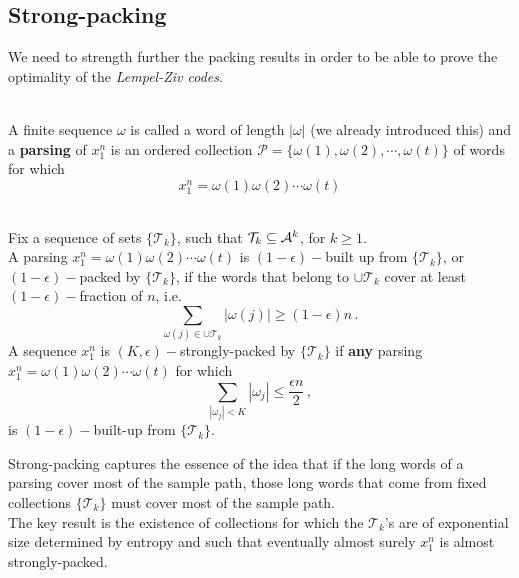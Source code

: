 \subsection{Strong-packing}
We need to strength further the packing results in order to be able to prove the optimality of the \textit{Lempel-Ziv codes}.
\begin{definition}
\hfill \\
    A finite sequence $\omega$ is called a word of length $|\omega|$ (we already introduced this) and a \textbf{parsing} of $x_1^n$ is an ordered collection $\mathcal{P} = \{ \omega(1), \omega(2), \cdots, \omega(t) \}$ of words for which 
    \begin{equation*}
        x_1^n = \omega(1) \omega(2) \cdots \omega(t)
    \end{equation*}
\end{definition}
\begin{definition}
\hfill\\
    Fix a sequence of sets $\{\mathcal{T}_k \}$, such that $\mathcal{T}_k \subseteq \mathcal{A}^k$, for $k \geq 1$. 
    \\A parsing $x_1^n = \omega(1) \omega(2) \cdots \omega(t)$ is $(1 - \epsilon)-$built up from $\{\mathcal{T}_k \}$, or $(1 - \epsilon)-$packed by $\{\mathcal{T}_k \}$, if the words that belong to $\cup \mathcal{T}_k$ cover at least $(1 - \epsilon)-$fraction of $n$, i.e.
    \begin{equation*}
        \sum_{\omega(j) \in \cup \mathcal{T}_k} |\omega(j)| \geq (1 - \epsilon) n \, .
    \end{equation*}
    A sequence $x_1^n$ is $(K, \epsilon)-$strongly-packed by $\{\mathcal{T}_k \}$ if \textbf{any} parsing $x_1^n = \omega(1) \omega(2) \cdots \omega(t)$ for which 
    \begin{equation*}
        \sum_{|\omega_j| < K} |\omega_j| \leq \frac{\epsilon n}{2} \, ,
    \end{equation*}
    is $(1 - \epsilon)-$built-up from $\{\mathcal{T}_k \}$.
\end{definition}
Strong-packing captures the essence of the idea that if the long words of a parsing cover most of the sample path, those long words that come from fixed collections  $\{\mathcal{T}_k \}$ must cover most of the sample path.
\\The key result is the existence of collections for which the $\mathcal{T}_k$’s are of exponential size determined by entropy and such that eventually almost
surely $x_1^n$ is almost strongly-packed.
